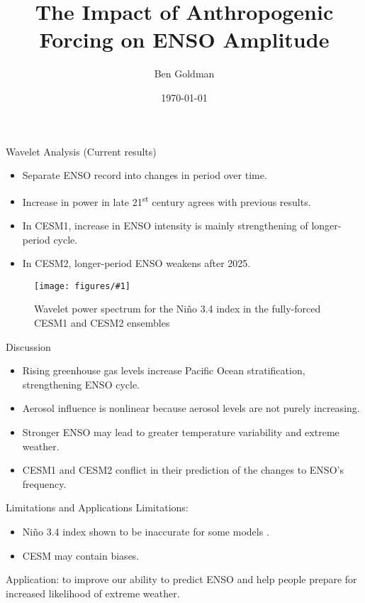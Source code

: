 \documentclass{beamer}
\title{The Impact of Anthropogenic Forcing on ENSO Amplitude}
\author{Ben Goldman}
\date{\today}
\newcommand{\myfig}[4]{
  \begin{figure}
    \centering
    \texttt{[image: figures/\#1]}
    \caption{#2}
    \label{fig:#4}
  \end{figure}
}
\begin{document}
\nocite{gistemp2019giss}
\nocite{lenssen2019improvements}
\nocite{ropelewski1987global}
\nocite{rayner2003global}
\nocite{lubbecke2014assessing}
\nocite{zhu2017reduced}
\nocite{zheng2017response}
\nocite{maher2018enso}
\nocite{kay2015community}
\nocite{danabasoglu2020community}

\begin{frame}

  \begin{block}{Wavelet Analysis (Current results)}
    \begin{itemize}
    \item Separate ENSO record into changes in period over time.
    \item Increase in power in late 21\textsuperscript{st} century agrees with previous results.
    \item In CESM1, increase in ENSO intensity is mainly strengthening of longer-period cycle.
    \item In CESM2, longer-period ENSO weakens after 2025.
    \end{itemize}
    \myfig{wavelet3.pdf}{Wavelet power spectrum for the Niño 3.4 index in the fully-forced CESM1 and CESM2 ensembles}{0.8}{wavelet2}
  \end{block}

  \vfill

  \begin{block}{Discussion}
    \begin{itemize}
    \item Rising greenhouse gas levels increase Pacific Ocean stratification, strengthening ENSO cycle.
    \item Aerosol influence is nonlinear because aerosol levels are not purely increasing.
    \item Stronger ENSO may lead to greater temperature variability and extreme weather.
    \item CESM1 and CESM2 conflict in their prediction of the changes to ENSO's frequency.
    \end{itemize}
  \end{block}

  \vfill

  \begin{block}{Limitations and Applications}
    Limitations:
    \begin{itemize}
    \item Niño 3.4 index shown to be inaccurate for some models \citep{cai2018increased}.
    \item CESM may contain biases.
    \end{itemize}
    Application: to improve our ability to predict ENSO and help people prepare for increased likelihood of extreme weather.
  \end{block}


\end{frame}
\end{document}
